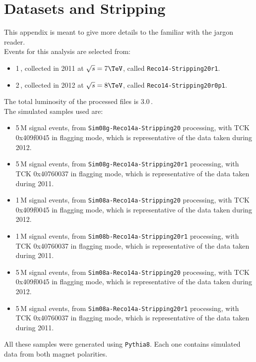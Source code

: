 
\chapter{Datasets and Stripping}
\label{AppendixC}
This appendix is meant to give more details to the familiar with the \lhcb jargon reader.\\
 
\noindent Events for this analysis are selected from:
\begin{itemize}
\item 1\,\invfb, collected in 2011 at $\sqrt{s}=7\TeV$, called \texttt{Reco14-Stripping20r1}.
\item 2\,\invfb, collected in 2012 at $\sqrt{s}=8\TeV$, called \texttt{Reco14-Stripping20r0p1}.
\end{itemize}
The total luminosity of the processed files is 3.0\,\invfb.\\

\noindent The simulated samples used are:

\begin{itemize}

\item %
5\,M \BsJpsiKst signal events, from \texttt{Sim08g-Reco14a-Stripping20} processing, with TCK 0x409f0045 in flagging mode, which is representative of the data taken during 2012.  

\item %
5\,M \BsJpsiKst signal events, from \texttt{Sim08g-Reco14a-Stripping20r1} processing, with TCK 0x40760037 in flagging mode, which is representative of the data taken during 2011.  

\item %
1\,M \BdJpsiKst signal events, from \texttt{Sim08a-Reco14a-Stripping20} processing, with TCK 0x409f0045 in flagging mode, which is representative of the data taken during 2012.  

\item %
1\,M \BdJpsiKst signal events, from \texttt{Sim08b-Reco14a-Stripping20r1} processing, with TCK 0x40760037 in flagging mode, which is representative of the data taken during 2011.    

\item %
5\,M \BsJpsiPhi signal events, from \texttt{Sim08a-Reco14a-Stripping20} processing, with TCK 0x409f0045 in flagging mode, which is representative of the data taken during 2012.  

\item %
5\,M \BsJpsiPhi signal events, from \texttt{Sim08a-Reco14a-Stripping20r1} processing, with TCK 0x40760037 in flagging mode, which is representative of the data taken during 2011.

\end{itemize}
All these samples were generated using \texttt{Pythia8}. Each one contains simulated data from both magnet polarities.\\

